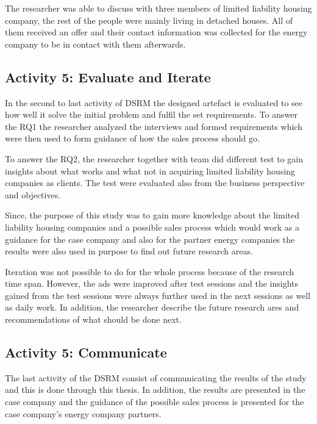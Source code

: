 The researcher was able to discuss with three members of limited liability housing company, the rest of the people were mainly living in detached houses. All of them received an offer and their contact information was collected for the energy company to be in contact with them afterwards.

\subsection{Activity 5: Evaluate and Iterate}

In the second to last activity of DSRM the designed artefact is evaluated to see how well it solve the initial problem and fulfil the set requirements. To answer the RQ1 the researcher analyzed the interviews and formed requirements which were then used to form guidance of how the sales process should go.

To answer the RQ2, the researcher together with team did different test to gain insights about what works and what not in acquiring limited liability housing companies as clients. The test were evaluated also from the business perspective and objectives.

Since, the purpose of this study was to gain more knowledge about the limited liability housing companies and a possible sales process which would work as a guidance for the case company and also for the partner energy companies the results were also used in purpose to find out future research areas.

Iteration was not possible to do for the whole process because of the research time span. However, the ads were improved after test sessions and the insights gained from the test sessions were always further used in the next sessions as well as daily work. In addition, the researcher describe the future research ares and recommendations of what should be done next.

\subsection{Activity 5: Communicate}

The last activity of the DSRM consist of communicating the results of the study and this is done through this thesis. In addition, the results are presented in the case company and the guidance of the possible sales process is presented for the case company's energy company partners.






 